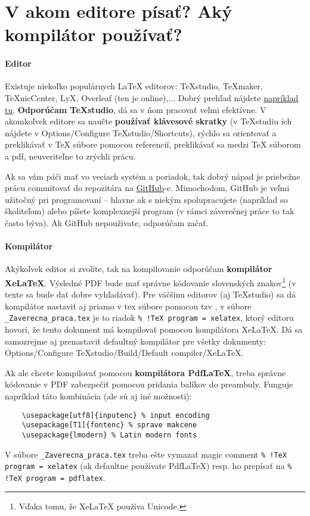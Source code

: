 \chapter{V akom editore písať? Aký kompilátor používať?}\label{sec:aky_editor}

\subsubsection{Editor}
Existuje niekoľko populárnych LaTeX editorov: TeXstudio, TeXmaker, TeXnicCenter, LyX, Overleaf (ten je online),... Dobrý prehľad nájdete \href{https://beebom.com/best-latex-editors/}{napríklad tu}. \textbf{Odporúčam TeXstudio}, dá sa v ňom pracovať veľmi efektívne. V akomkoľvek editore sa naučte \textbf{používať klávesové skratky} (v TeXstudiu ich nájdete v Options/Configure TeXstudio/Shortcuts), rýchlo sa orientovať a preklikávať v TeX súbore pomocou referencií, preklikávať sa medzi TeX súborom a pdf, neuveriteľne to zrýchli prácu.

Ak sa vám páči mať vo veciach systém a poriadok, tak dobrý nápad je priebežne prácu commitovať do repozitára na \href{https://github.com/}{GitHub}-e. Mimochodom, GitHub je veľmi užitočný pri programovaní -- hlavne ak s niekým spolupracujete (napríklad so školiteľom) alebo píšete komplexnejší program (v rámci záverečnej práce to tak často býva). Ak GitHub nepoužívate, odporúčam začať.

\subsubsection{Kompilátor}
Akýkoľvek editor si zvolíte, tak na kompilovanie odporúčam \textbf{kompilátor XeLaTeX}. Výsledné PDF bude mať správne kódovanie slovenských znakov\footnote{Vďaka tomu, že XeLaTeX používa Unicode.} (v texte sa bude dať dobre vyhľadávať). Pre väčšinu editorov (aj TeXstudio) sa dá kompilátor nastaviť aj priamo v tex súbore pomocou tzv , v súbore \verb|_Zaverecna_praca.tex| je to riadok \verb|% !TeX program = xelatex|, ktorý editoru hovorí, že tento dokument má kompilovať pomocou kompilátora XeLaTeX. Dá sa samozrejme aj prenastaviť defaultný kompilátor pre všetky dokumenty: Options/Configure TeXstudio/Build/Default compiler/XeLaTeX.

Ak ale chcete kompilovať pomocou \textbf{kompilátora PdfLaTeX}, treba správne kódovanie v PDF zabezpečiť pomocou pridania balíkov do preambuly. Funguje napríklad táto kombinácia (ale sú aj iné možnosti):
\begin{verbatim}
	\usepackage[utf8]{inputenc} % input encoding
	\usepackage[T1]{fontenc} % sprave makcene
	\usepackage{lmodern} % Latin modern fonts
\end{verbatim}
V súbore \verb|_Zaverecna_praca.tex| treba ešte vymazať magic comment \verb|% !TeX program = xelatex| (ak defaultne používate PdfLaTeX) resp. ho prepísať na \verb|% !TeX program = pdflatex|.

